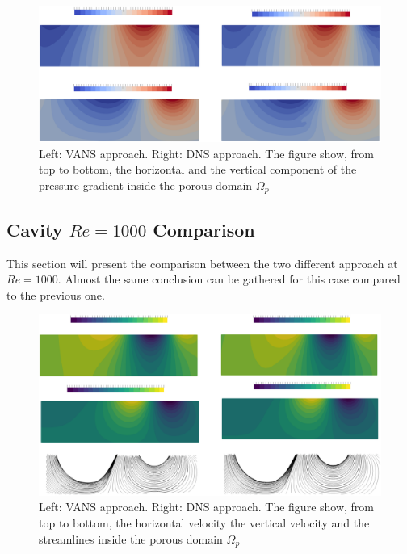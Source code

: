 \begin{figure}[h]
	\centering
	\includegraphics[width=1\linewidth]{chapter_5/figure/re100/vans_p}
	\caption{Left: VANS approach. Right: DNS approach. The figure show, from top to bottom, the horizontal and the vertical component of the pressure gradient inside the porous domain $\Omega_p$}
	\label{fig:100_p}
\end{figure}


\subsection{Cavity $Re=1000$ Comparison}

This section will present the comparison between the two different approach at $Re=1000$.
Almost the same conclusion can be gathered for this case compared to the previous one.

\begin{figure}[h]
	\centering
	\includegraphics[width=1\linewidth]{chapter_5/figure/re1000/vans_u}
	\caption{Left: VANS approach. Right: DNS approach. The figure show, from top to bottom, the horizontal velocity the vertical velocity and the streamlines inside the porous domain $\Omega_p$}
	\label{fig:1000_u}
\end{figure}

